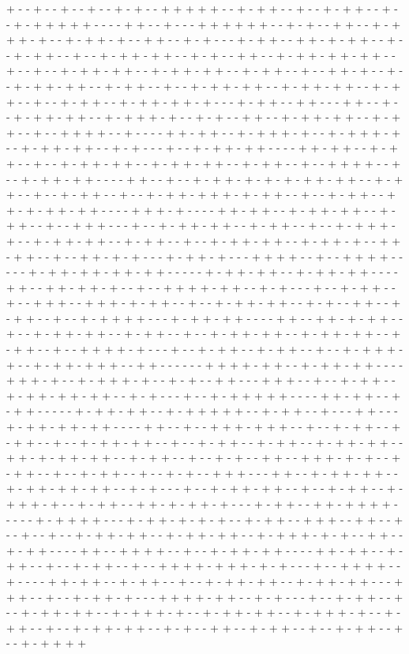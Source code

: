 + - - + - - + - - + - - + - + - - + + + + + - - + - + + - - + - - + - + + - - + - - + - + + + + + - - - - + + - - + - - - + + + + + + - - + - + - - + + - - + - + + + - + - - + - + + - + - - + + - - + - + - - - + - + + - - + + - + - + + - - + - - + - + + - - + - - + - + + - + + - - + - + - - + + - - + - + + - + + - + + - - + - - + - - + - + + - + + - - + - + + - + + - - + - + + - - + - - + + - + - - + - - + - + + - + + - - + - + + - - + - - + - + + - + + - - + - + + - + + - - + - + + - - + - - + - + + - - + - + + - + + - + - - - + - + + - - + + - - - + + - - + - - + - + + - + + - - + - + + + - + - - + - + - - + + - - + - + + - + + - - + - + + - - + - - + + + + - - + - - - - + + - + + - - + - + + + - + - - + - + + + - + - - + - + + - + + - - + - + - - - + - - + - + + - + + - - - - + + - + + - - + - + + - - + - - + - + + - + + - - + - + + - + + - - + - + + - - + - - + + + + - - + - - + - + + - + + - - - - + + - - + - - + - + + - + - + - + - + + - + + - - + - + + - - + - - + - + + - - + - - + - + + - + + + - + - + + - - + - - + - + + - - + + - + - + + - + + - - - - + + + - + - - - - + + - + + - - + - + + - + + - - + - + + - - + - - + + + - - - + - - + - + + - + + - - + - + + - - + - - + - + + + - + - - + - + + - + + - - + - + + - - + - - + - + + - + + - - + - + + - + - - + + - + + - - + - - + + - + - + - - - + - + + - + - - - + + + + - - + - - + + + + - - - - - + - + + - + + - + + - + + - - - - - + - + + - + + - - + - + + - + + - - - - + + - - + + - + + - + - - + - - + + + + - + + - - + - + - - - + - - + - + + - - + - - + + + - - + + + - + - + + - - + - - + - + + - + + - - + - + - - + + - - + - + + - - + - - + - + + + + - - - + - + + - + + - - - - + + - - + + - + - + + - - + - - + - + + - + + - - + - + + - - + - - + - + + - + + - - + - + + - + + - - + - + + - - + - - + + + + - + - - - + - - + - + + - - + - + + - - + - - + - + + + - + - - + - + + - + + + - - + + - - - - - - + + + + - + + - - + - + + - + + - - - - + + + - + - - + - + + + - + - - + - + - - + + - - - + + + - - + - - + - + + - - + - + + - + + - + + - - + - + - - - + - - + - + + + + + - - - - + + - + + - - + - + + - - - - - + - + + - + + - - + - + + + + + - - + - + + - - + - - - + + - - - + - + + - + + - + + - - - - + + - - + - - + + + - + + + - - + - - + - + + - - + - + + - - + - - + - + + - + + - - + - - + - + + - - + - + + - - + - + + - + + - - + + - + - + + - + + - - + - + + - - + - - + - + - - + + - - + + + - + - + - - + - + + - - + - - + - + + - - + - - + - + - - + + + - - - + + - - + - + + - + + - - + - + + - + + - + + - - + - + - - - + - - + - + + - + + - - + - - + - + + - - + - + + + - + - - + - + + - - + + - + - + + - + - - - + - + + - - + + - + + + + - - - - - + - + + + + - - - + - + + - + - + - + - - + - + + - - + + + - - + + - - + - - + - - + - - + - + + - + + - - + - + + - + + - - + - + + + - + - + - - + + - - + - + + - - - - + + - - + + + + - - + - - + - + + - + + - - - - + + - + + - - + - + + - - + - - + - + + - - + - - + + + + - + + + - + - + - - - + - - + + + + - - + - - - - + + - + + - - + - + + - - + - - + - + + - + + - - + - + + - + + - - - + + + - - + - - + - + + - + - - - + + + + - + + - - + - + - - - + - - + - + + - - + - - + - + + - + + - - + - + + + - + - - + - + + - + + - - + - + + + - + - - + - + + - - + - - + - + + - + + - - + - + - - + + - - + - + + - - + - - + - + + - - + - - + - + + + + 